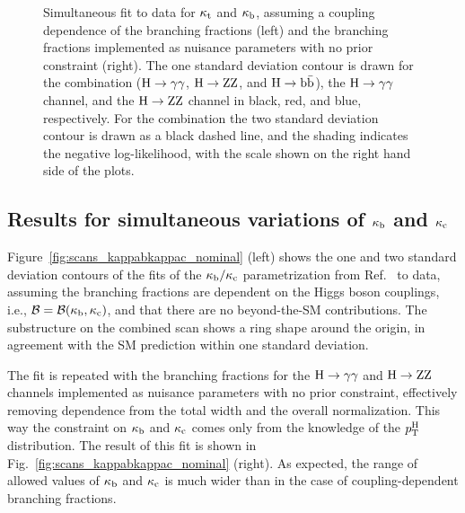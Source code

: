 \begin{figure}[hbtp]
\begin{center}
{        }
    \caption{
        Simultaneous fit to data for $\kappa_{\mathrm{t}}$ and $\kappa_{\mathrm{b}}$, assuming a coupling dependence of the branching fractions (left) and the branching fractions implemented as nuisance parameters with no prior constraint (right).
        The one standard deviation contour is drawn for the combination ($\mathrm{H}\to\mathrm{\gamma}\mathrm{\gamma}$, $\mathrm{H}\to\mathrm{Z}\mathrm{Z}$, and $\mathrm{H}\to\mathrm{b}\bar{\mathrm{b}}$), the $\mathrm{H}\to\mathrm{\gamma}\mathrm{\gamma}$ channel, and the $\mathrm{H}\to\mathrm{Z}\mathrm{Z}$ channel in black, red, and blue, respectively.
        For the combination the two standard deviation contour is drawn as a black dashed line, and the shading indicates the negative log-likelihood, with the scale shown on the right hand side of the plots.
        }
    \label{fig:scans_kappatkappab_rawInput}
  \end{center}
\end{figure}


\subsection{Results for simultaneous variations of \texorpdfstring{$\kappa_{\mathrm{b}}$}{kb} and \texorpdfstring{$\kappa_{\mathrm{c}}$}{kc}}


Figure~\ref{fig:scans_kappabkappac_nominal} (left) shows the one and two standard deviation contours of the fits of the $\kappa_{\mathrm{b}}/\kappa_{\mathrm{c}}$ parametrization from Ref.~\cite{Bishara:2016jga} to data, assuming the branching fractions are dependent on the Higgs boson couplings, i.e., $\mathcal{B} = \mathcal{B}(\kappa_{\mathrm{b}}, \kappa_{\mathrm{c}})$, and that there are no beyond-the-SM contributions.
% 
The substructure on the combined scan shows a ring shape around the origin, in agreement with the SM prediction within one standard deviation.


The fit is repeated with the branching fractions for the $\mathrm{H}\to\mathrm{\gamma}\mathrm{\gamma}$ and $\mathrm{H}\to\mathrm{Z}\mathrm{Z}$ channels implemented as nuisance parameters with no prior constraint, effectively removing dependence from the total width and the overall normalization.
% 
This way the constraint on $\kappa_{\mathrm{b}}$ and $\kappa_{\mathrm{c}}$ comes only from the knowledge of the $p_\mathrm{T}^\mathrm{H}$ distribution.
% 
The result of this fit is shown in Fig.~\ref{fig:scans_kappabkappac_nominal} (right).
% 
As expected, the range of allowed values of $\kappa_{\mathrm{b}}$ and $\kappa_{\mathrm{c}}$ is much wider than in the case of coupling-dependent branching fractions.

